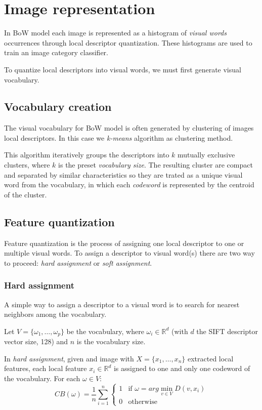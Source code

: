 \section{Image representation}

In BoW model each image is represented as a histogram of \emph{visual words} occurrences through local descriptor quantization\cite{DBLP:journals/corr/abs-1304-5168}. These histograms are used to train an image category classifier.

To quantize local descriptors into visual words, we must first generate visual vocabulary. 

\subsection{Vocabulary creation}

The visual vocabulary for BoW model is often generated by clustering of images local descriptors. In this case we \emph{k-means} algorithm as clustering method.

This algorithm iteratively groups the descriptors into $k$ mutually exclusive clusters, where $k$ is the preset \emph{vocabulary size}. The resulting cluster are compact and separated by similar characteristics so they are trated as a unique visual word from the vocabulary, in which each \emph{codeword} is represented by the centroid of the cluster.

\subsection{Feature quantization}

Feature quantization is the process of assigning one local descriptor to one or multiple
visual words. To assign a descriptor to visual word(s) there are two way to proceed: \emph{hard assignment} or \emph{soft assignment}.

\subsubsection{Hard assignment}

A simple way to assign a descriptor to a visual word is to search for nearest neighbors among the vocabulary.

Let $V = \{\omega_1, \ldots, \omega_p \}$ be the vocabulary, where $\omega_i \in \mathbb{R}^{d}$ (with $d$ the SIFT descriptor vector size, 128) and $n$ is the vocabulary size.

In \emph{hard assignment}, given and image with $X = \{x_1, \ldots, x_n\}$ extracted local features, each local feature $x_i \in \mathbb{R}^{d}$ is assigned to one and only one codeword of the vocabulary. For each $\omega \in V$:
\begin{equation}
CB(\omega) = \frac{1}{n} \sum_{i = 1}^{n} \left\{
\begin{array}{rl}
1 & \mbox{if } \omega = arg \min_{v \in V} D(v, x_i) \\
0 & \mbox{otherwise}
\end{array}
\right.
\end{equation}

